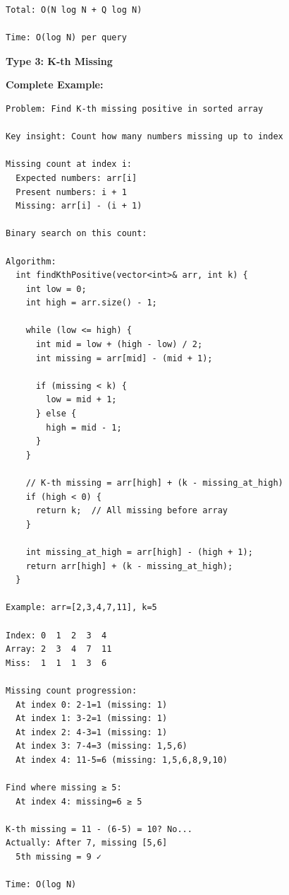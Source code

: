 \documentclass[11pt,a4paper,oneside]{book}
\begin{document}
\begin{tcolorbox}[
    enhanced,breakable,
    colback=lightgray,
    colframe=accentorange,
    boxrule=2pt,
    arc=4mm,
    title=\textbf{Complete Counting Patterns}
]
\begin{verbatim}
Total: O(N log N + Q log N)

Time: O(log N) per query
\end{verbatim}

\textbf{Type 3: K-th Missing}

\textbf{Complete Example:}
\begin{verbatim}
Problem: Find K-th missing positive in sorted array

Key insight: Count how many numbers missing up to index

Missing count at index i:
  Expected numbers: arr[i]
  Present numbers: i + 1
  Missing: arr[i] - (i + 1)

Binary search on this count:

Algorithm:
  int findKthPositive(vector<int>& arr, int k) {
    int low = 0;
    int high = arr.size() - 1;
    
    while (low <= high) {
      int mid = low + (high - low) / 2;
      int missing = arr[mid] - (mid + 1);
      
      if (missing < k) {
        low = mid + 1;
      } else {
        high = mid - 1;
      }
    }
    
    // K-th missing = arr[high] + (k - missing_at_high)
    if (high < 0) {
      return k;  // All missing before array
    }
    
    int missing_at_high = arr[high] - (high + 1);
    return arr[high] + (k - missing_at_high);
  }

Example: arr=[2,3,4,7,11], k=5

Index: 0  1  2  3  4
Array: 2  3  4  7  11
Miss:  1  1  1  3  6

Missing count progression:
  At index 0: 2-1=1 (missing: 1)
  At index 1: 3-2=1 (missing: 1)
  At index 2: 4-3=1 (missing: 1)
  At index 3: 7-4=3 (missing: 1,5,6)
  At index 4: 11-5=6 (missing: 1,5,6,8,9,10)

Find where missing ≥ 5:
  At index 4: missing=6 ≥ 5
  
K-th missing = 11 - (6-5) = 10? No...
Actually: After 7, missing [5,6]
  5th missing = 9 ✓

Time: O(log N)
\end{verbatim}
\end{tcolorbox}
\end{document}
